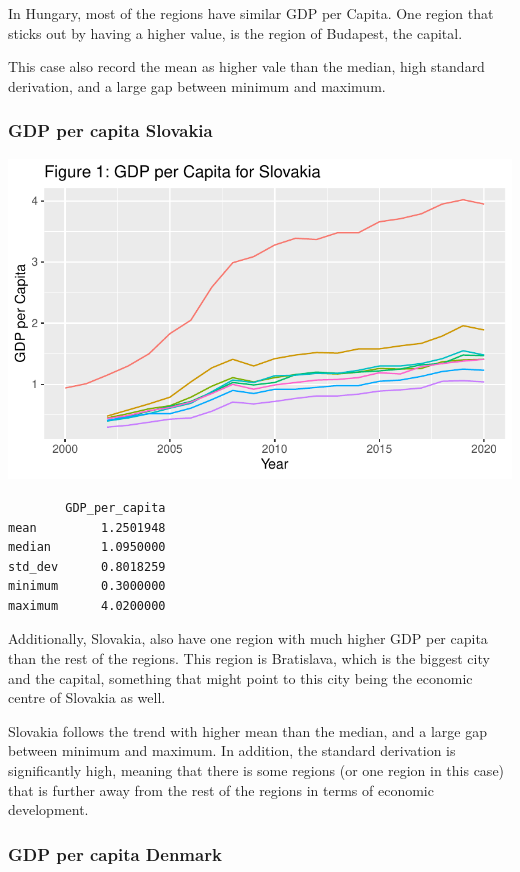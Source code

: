\documentclass[
  a4paper,
  DIV=11,
  numbers=noendperiod]{scrartcl}
\begin{document}
In Hungary, most of the regions have similar GDP per Capita. One region
that sticks out by having a higher value, is the region of Budapest, the
capital.

This case also record the mean as higher vale than the median, high
standard derivation, and a large gap between minimum and maximum.

\hypertarget{gdp-per-capita-slovakia}{%
\subsubsection{GDP per capita Slovakia}\label{gdp-per-capita-slovakia}}

\includegraphics{MSB104_GR_1_Final_Assignment_research_article_files/figure-pdf/unnamed-chunk-16-1.pdf}

\begin{verbatim}
        GDP_per_capita
mean         1.2501948
median       1.0950000
std_dev      0.8018259
minimum      0.3000000
maximum      4.0200000
\end{verbatim}

Additionally, Slovakia, also have one region with much higher GDP per
capita than the rest of the regions. This region is Bratislava, which is
the biggest city and the capital, something that might point to this
city being the economic centre of Slovakia as well.

Slovakia follows the trend with higher mean than the median, and a large
gap between minimum and maximum. In addition, the standard derivation is
significantly high, meaning that there is some regions (or one region in
this case) that is further away from the rest of the regions in terms of
economic development.

\hypertarget{gdp-per-capita-denmark}{%
\subsubsection{GDP per capita Denmark}\label{gdp-per-capita-denmark}}
\end{document}
